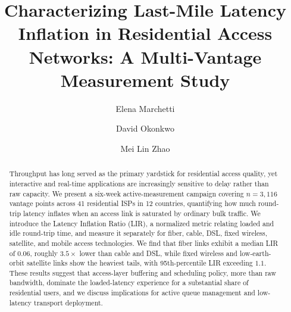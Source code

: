 \documentclass[10pt,sigconf,letterpaper,anonymous,nonacm]{acmart}
\begin{document}
\title{Characterizing Last-Mile Latency Inflation in Residential Access Networks: A
Multi-Vantage Measurement Study}

\author{Elena Marchetti}

\author{David Okonkwo}

\author{Mei Lin Zhao}

\begin{abstract}
Throughput has long served as the primary yardstick for residential access quality, yet
interactive and real-time applications are increasingly sensitive to delay rather than raw
capacity. We present a six-week active-measurement campaign covering $n=3{,}116$ vantage
points across 41 residential ISPs in 12 countries, quantifying how much round-trip latency
inflates when an access link is saturated by ordinary bulk traffic. We introduce the Latency
Inflation Ratio (LIR), a normalized metric relating loaded and idle round-trip time, and
measure it separately for fiber, cable, DSL, fixed wireless, satellite, and mobile access
technologies. We find that fiber links exhibit a median LIR of $0.06$, roughly $3.5\times$
lower than cable and DSL, while fixed wireless and low-earth-orbit satellite links show the
heaviest tails, with 95th-percentile LIR exceeding $1.1$. These results suggest that
access-layer buffering and scheduling policy, more than raw bandwidth, dominate the
loaded-latency experience for a substantial share of residential users, and we discuss
implications for active queue management and low-latency transport deployment.
\end{abstract}



\maketitle
\end{document}
